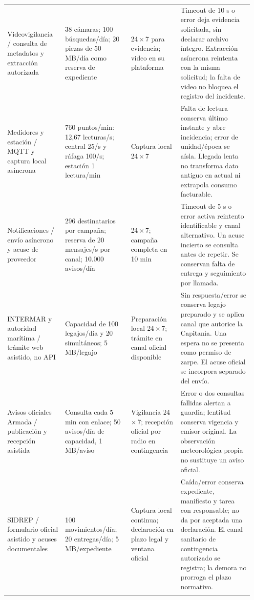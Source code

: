 \begin{longtable}{@{}L{.19\textwidth}L{.26\textwidth}L{.20\textwidth}L{\dimexpr.35\textwidth-18pt\relax}@{}}
Videovigilancia / consulta de metadatos y extracción autorizada & 38 cámaras; 100 búsquedas/día; 20 piezas de 50 MB/día como reserva de expediente & 24\,$\times$\,7 para evidencia; video en su plataforma & Timeout de 10 s o error deja evidencia solicitada, sin declarar archivo íntegro. Extracción asíncrona reintenta con la misma solicitud; la falta de video no bloquea el registro del incidente. \\\addlinespace\hline
Medidores y estación / MQTT y captura local asíncrona & 760 puntos/min: 12,67 lecturas/s; central 25/s y ráfaga 100/s; estación 1 lectura/min & Captura local 24\,$\times$\,7 & Falta de lectura conserva último instante y abre incidencia; error de unidad/época se aísla. Llegada lenta no transforma dato antiguo en actual ni extrapola consumo facturable. \\\addlinespace\hline
Notificaciones / envío asíncrono y acuse de proveedor & 296 destinatarios por campaña; reserva de 20 mensajes/s por canal; 10.000 avisos/día & 24\,$\times$\,7; campaña completa en 10 min & Timeout de 5 s o error activa reintento identificable y canal alternativo. Un acuse incierto se consulta antes de repetir. Se conservan falta de entrega y seguimiento por llamada. \\\addlinespace\hline
INTERMAR y autoridad marítima / trámite web asistido, no API & Capacidad de 100 legajos/día y 20 simultáneos; 5 MB/legajo & Preparación local 24\,$\times$\,7; trámite en canal oficial disponible & Sin respuesta/error se conserva legajo preparado y se aplica canal que autorice la Capitanía. Una espera no se presenta como permiso de zarpe. El acuse oficial se incorpora separado del envío. \\\addlinespace\hline
Avisos oficiales Armada / publicación y recepción asistida & Consulta cada 5 min con enlace; 50 avisos/día de capacidad, 1 MB/aviso & Vigilancia 24\,$\times$\,7; recepción oficial por radio en contingencia & Error o dos consultas fallidas alertan a guardia; lentitud conserva vigencia y emisor original. La observación meteorológica propia no sustituye un aviso oficial. \\\addlinespace\hline
SIDREP / formulario oficial asistido y acuses documentales & 100 movimientos/día; 20 entregas/día; 5 MB/expediente & Captura local continua; declaración en plazo legal y ventana oficial & Caída/error conserva expediente, manifiesto y tarea con responsable; no da por aceptada una declaración. El canal sanitario de contingencia autorizado se registra; la demora no prorroga el plazo normativo. \\\addlinespace\hline

\end{longtable}
